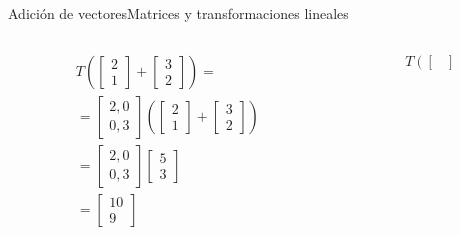 \documentclass[spanish, c]{beamer}
\begin{document}
\begin{frame}[allowframebreaks]{Adición de vectores}{Matrices y transformaciones lineales}
    \begin{columns}
        \begin{column}{0.5\textwidth}
            \begin{align*}
                & T \left (
                \begin{bmatrix}
                    2 \\ 1
                \end{bmatrix}
                 +
                 \begin{bmatrix}
                    3 \\ 2 
                 \end{bmatrix} \right ) = \\[2ex]
                 & =
                 \begin{bmatrix}
                    2, 0 \\
                    0 , 3
                \end{bmatrix} \left(
                    \begin{bmatrix}
                        2 \\ 1
                    \end{bmatrix}
                     +
                     \begin{bmatrix}
                        3 \\ 2 
                     \end{bmatrix} \right )\\
                 & =
                 \begin{bmatrix}
                    2, 0 \\
                    0 , 3
                \end{bmatrix}
                 \begin{bmatrix}
                     5 \\ 3
                 \end{bmatrix} \\
                & =
                \begin{bmatrix}
                    10 \\ 9
                \end{bmatrix}
            \end{align*}
        \end{column}
        \begin{column}{0.5\textwidth}
            \begin{align*}
                & T \left( \begin{bmatrix}

\end{bmatrix}
\end{align*}
\end{column}
\end{columns}
\end{frame}
\end{document}
